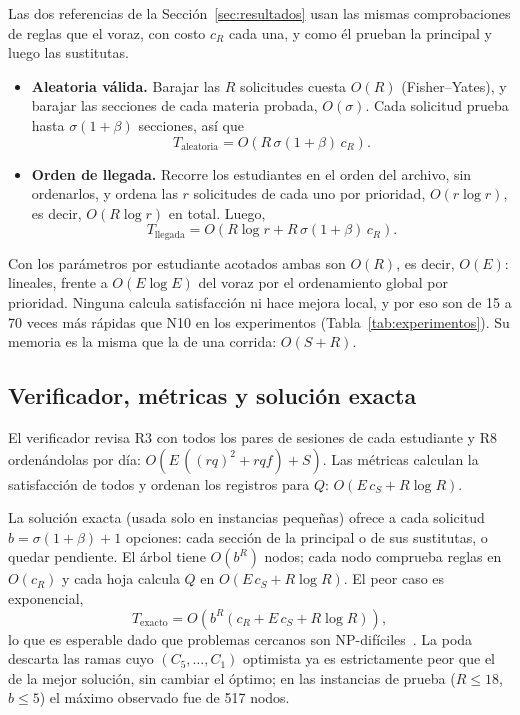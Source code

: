 Las dos referencias de la Sección~\ref{sec:resultados} usan las mismas comprobaciones de reglas que el voraz, con costo $c_R$ cada una, y como él prueban la principal y luego las sustitutas.
\begin{itemize}
\item \textbf{Aleatoria válida.} Barajar las $R$ solicitudes cuesta $O(R)$ (Fisher--Yates), y barajar las secciones de cada materia probada, $O(\sigma)$. Cada solicitud prueba hasta $\sigma(1+\beta)$ secciones, así que
\[
T_{\mathrm{aleatoria}} = O\!\left(R\,\sigma(1+\beta)\,c_R\right).
\]
\item \textbf{Orden de llegada.} Recorre los estudiantes en el orden del archivo, sin ordenarlos, y ordena las $r$ solicitudes de cada uno por prioridad, $O(r \log r)$, es decir, $O(R \log r)$ en total. Luego,
\[
T_{\mathrm{llegada}} = O\!\left(R \log r + R\,\sigma(1+\beta)\,c_R\right).
\]
\end{itemize}
Con los parámetros por estudiante acotados ambas son $O(R)$, es decir, $O(E)$: lineales, frente a $O(E \log E)$ del voraz por el ordenamiento global por prioridad. Ninguna calcula satisfacción ni hace mejora local, y por eso son de 15 a 70 veces más rápidas que N10 en los experimentos (Tabla~\ref{tab:experimentos}). Su memoria es la misma que la de una corrida: $O(S + R)$.

\subsection{Verificador, métricas y solución exacta}

El verificador revisa R3 con todos los pares de sesiones de cada estudiante y R8 ordenándolas por día: $O\!\left(E\,((rq)^2 + rqf) + S\right)$. Las métricas calculan la satisfacción de todos y ordenan los registros para $Q$: $O(E\,c_S + R \log R)$.

La solución exacta (usada solo en instancias pequeñas) ofrece a cada solicitud $b = \sigma(1+\beta) + 1$ opciones: cada sección de la principal o de sus sustitutas, o quedar pendiente. El árbol tiene $O(b^R)$ nodos; cada nodo comprueba reglas en $O(c_R)$ y cada hoja calcula $Q$ en $O(E\,c_S + R \log R)$. El peor caso es exponencial,
\[
T_{\mathrm{exacto}} = O\!\left(b^R \left(c_R + E\,c_S + R\log R\right)\right),
\]
lo que es esperable dado que problemas cercanos son NP-difíciles~\cite{spieksma1999}. La poda descarta las ramas cuyo $(C_5,\dots,C_1)$ optimista ya es estrictamente peor que el de la mejor solución, sin cambiar el óptimo; en las instancias de prueba ($R \le 18$, $b \le 5$) el máximo observado fue de 517 nodos.

